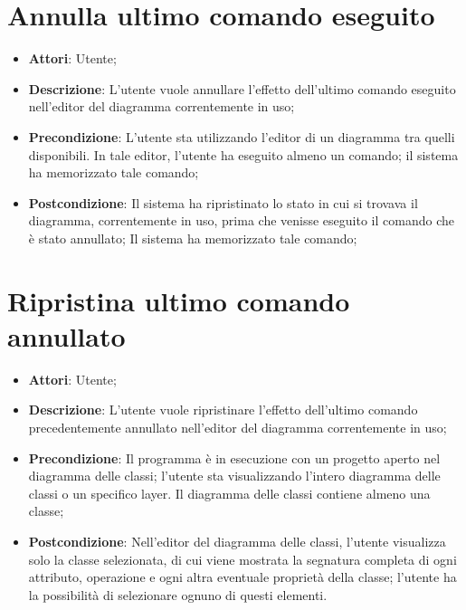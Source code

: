 \documentclass[../AnalisiDeiRequisiti.tex]{subfiles}
\begin{document}
	\section{Annulla ultimo comando eseguito}
	\begin{itemize}
		\item \textbf{Attori}: Utente;
		\item \textbf{Descrizione}: L'utente vuole annullare l'effetto dell'ultimo comando eseguito nell'editor del diagramma correntemente in uso;
		\item \textbf{Precondizione}: L'utente sta utilizzando l'editor di un diagramma tra quelli disponibili. In tale editor, l'utente ha eseguito almeno un comando; il sistema ha memorizzato tale comando;
		\item \textbf{Postcondizione}: Il sistema ha ripristinato lo stato in cui si trovava il diagramma, correntemente in uso, prima che venisse eseguito il comando che è stato annullato; Il sistema ha memorizzato tale comando;
	\end{itemize}		

	\section{Ripristina ultimo comando annullato}
	\begin{itemize}
		\item \textbf{Attori}: Utente;
		\item \textbf{Descrizione}: L'utente vuole ripristinare l'effetto dell'ultimo comando precedentemente annullato nell'editor del diagramma correntemente in uso;
		\item \textbf{Precondizione}: Il programma è in esecuzione con un progetto aperto nel diagramma delle classi; l'utente sta visualizzando l'intero diagramma delle classi o un specifico layer. Il diagramma delle classi contiene almeno una classe;
		\item \textbf{Postcondizione}: Nell'editor del diagramma delle classi, l'utente visualizza solo la classe selezionata, di cui viene mostrata la segnatura completa di ogni attributo, operazione e ogni altra eventuale proprietà della classe; l'utente ha la possibilità di selezionare ognuno di questi elementi.
	\end{itemize}	
	
\end{document}
